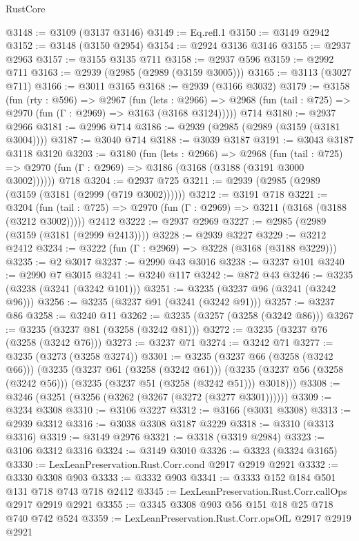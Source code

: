 \begin{lexlean}{RustCore}
\begin{coremodule}
@3148 := @3109 (@3137 @3146)
@3149 := Eq.refl.{1}
@3150 := @3149 @2942
@3152 := @3148 (@3150 @2954)
@3154 := @2924 @3136 @3146
@3155 := @2937 @2963
@3157 := @3155 @3135 @711
@3158 := @2937 @596
@3159 := @2992 @711
@3163 := @2939 (@2985 (@2989 (@3159 @3005)))
@3165 := @3113 (@3027 @711)
@3166 := @3011 @3165
@3168 := @2939 (@3166 @3032)
@3179 := @3158
    (fun (rty : @596) =>
    @2967
      (fun (lets : @2966) =>
      @2968 (fun (tail : @725) => @2970 (fun (Γ : @2969) => @3163 (@3168 @3124)))))
    @714
@3180 := @2937 @2966
@3181 := @2996 @714
@3186 := @2939 (@2985 (@2989 (@3159 (@3181 @3004))))
@3187 := @3040 @714
@3188 := @3039 @3187
@3191 := @3043 @3187 @3118 @3120
@3203 := @3180
    (fun (lets : @2966) =>
    @2968
      (fun (tail : @725) => @2970 (fun (Γ : @2969) => @3186 (@3168 (@3188 (@3191 @3000 @3002))))))
    @718
@3204 := @2937 @725
@3211 := @2939 (@2985 (@2989 (@3159 (@3181 (@2999 (@719 @3002))))))
@3212 := @3191 @718
@3221 := @3204
    (fun (tail : @725) => @2970 (fun (Γ : @2969) => @3211 (@3168 (@3188 (@3212 @3002)))))
    @2412
@3222 := @2937 @2969
@3227 := @2985 (@2989 (@3159 (@3181 (@2999 @2413))))
@3228 := @2939 @3227
@3229 := @3212 @2412
@3234 := @3222 (fun (Γ : @2969) => @3228 (@3168 (@3188 @3229)))
@3235 := @2 @3017
@3237 := @2990 @43 @3016
@3238 := @3237 @101
@3240 := @2990 @7 @3015
@3241 := @3240 @117
@3242 := @872 @43
@3246 := @3235 (@3238 (@3241 (@3242 @101)))
@3251 := @3235 (@3237 @96 (@3241 (@3242 @96)))
@3256 := @3235 (@3237 @91 (@3241 (@3242 @91)))
@3257 := @3237 @86
@3258 := @3240 @11
@3262 := @3235 (@3257 (@3258 (@3242 @86)))
@3267 := @3235 (@3237 @81 (@3258 (@3242 @81)))
@3272 := @3235 (@3237 @76 (@3258 (@3242 @76)))
@3273 := @3237 @71
@3274 := @3242 @71
@3277 := @3235 (@3273 (@3258 @3274))
@3301 := @3235
    (@3237 @66 (@3258 (@3242 @66)))
    (@3235
      (@3237 @61 (@3258 (@3242 @61)))
      (@3235 (@3237 @56 (@3258 (@3242 @56))) (@3235 (@3237 @51 (@3258 (@3242 @51))) @3018)))
@3308 := @3246 (@3251 (@3256 (@3262 (@3267 (@3272 (@3277 @3301))))))
@3309 := @3234 @3308
@3310 := @3106 @3227
@3312 := @3166 (@3031 @3308)
@3313 := @2939 @3312
@3316 := @3038 @3308 @3187 @3229
@3318 := @3310 (@3313 @3316)
@3319 := @3149 @2976
@3321 := @3318 (@3319 @2984)
@3323 := @3106 @3312 @3316
@3324 := @3149 @3010
@3326 := @3323 (@3324 @3165)
@3330 := LexLeanPreservation.Rust.Corr.cond @2917 @2919 @2921
@3332 := @3330 @3308 @903
@3333 := @3332 @903
@3341 := @3333 @152 @184 @501 @131 @718 @743 @718 @2412
@3345 := LexLeanPreservation.Rust.Corr.callOps @2917 @2919 @2921
@3355 := @3345 @3308 @903 @56 @151 @18 @25 @718 @740 @742 @524
@3359 := LexLeanPreservation.Rust.Corr.opsOfL @2917 @2919 @2921

\end{coremodule}
\end{lexlean}
